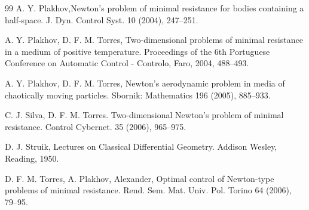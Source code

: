 \documentclass[a4paper,12pt]{amsart}
\theoremstyle{definition}
\begin{document}
\begin{thebibliography}{99}
 A. Y. Plakhov,Newton’s problem of minimal resistance for bodies containing a half-space. J. Dyn. Control Syst.  10   (2004), 247--251.

  A. Y. Plakhov, D. F. M. Torres, Two-dimensional problems of minimal resistance in a medium of positive temperature. Proceedings of the 6th Portuguese Conference on Automatic Control - Controlo, Faro, 2004, 488–493.

  A. Y. Plakhov, D. F. M. Torres, Newton’s aerodynamic problem in media of chaotically moving particles. Sbornik: Mathematics 196 (2005), 885--933.
 

 C. J. Silva, D. F. M. Torres. Two-dimensional Newton's problem of minimal resistance. Control Cybernet. 35 (2006), 965--975.

 D. J. Struik, Lectures on Classical Differential Geometry. Addison Wesley, Reading, 1950.

 D. F. M. Torres, A. Plakhov, Alexander, Optimal control of Newton-type problems of minimal resistance. Rend. Sem. Mat. Univ. Pol. Torino 64 (2006), 79--95.

\end{thebibliography}
\end{document}
